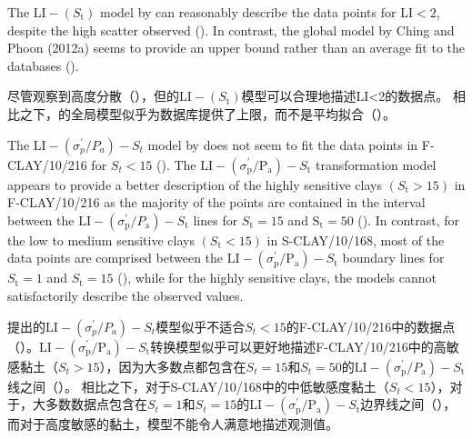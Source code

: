 \begin{ParaColumn}
    \switchcolumn*

    The $\mathrm{LI}-\left(S_{\mathrm{t}}\right)$ model by \citet{Bjerrum195449} can reasonably describe the data points for $\mathrm{LI}<2$, despite the high scatter observed (). In contrast, the global model by Ching and Phoon (2012a) seems to provide an upper bound rather than an average fit to the databases ().

    \switchcolumn

    尽管观察到高度分散（），但\citet{Bjerrum195449}的$\mathrm{LI}-\left(S_{\mathrm{t}}\right)$模型可以合理地描述LI<2的数据点。 相比之下，\citet{Ching2012522}的全局模型似乎为数据库提供了上限，而不是平均拟合（）。

    \switchcolumn*

    The $\mathrm{LI}-\left(\sigma_{p}^{\prime} / P_{a}\right)-S_{t}$ model by \citet{Ching2012522} does not seem to fit the data points in F-CLAY/10/216 for $S_t<15$ (). The $\mathrm{LI}-\left(\sigma_{\mathrm{p}}^{\prime} / \mathrm{P}_{\mathrm{a}}\right)-S_{\mathrm{t}}$ transformation model appears to provide a better description of the highly sensitive clays $\left(S_{\mathrm{t}}>15\right)$ in F-CLAY/10/216 as the majority of the points are contained in the interval between the $\mathrm{LI}-\left(\sigma_{\mathrm{p}}^{\prime} / P_{\mathrm{a}}\right)-S_{\mathrm{t}}$ lines for $S_{\mathrm{t}}=15$ and $\mathrm{S}_{\mathrm{t}}=50$ (). In contrast, for the low to medium sensitive clays $\left(S_{\mathrm{t}}<15\right)$ in S-CLAY/10/168, most of the data points are comprised between the $\mathrm{LI}-\left(\sigma_{\mathrm{p}}^{\prime} / \mathrm{P}_{\mathrm{a}}\right)-S_{\mathrm{t}}$ boundary lines for $S_{\mathrm{t}}=1$ and $S_{\mathrm{t}}=15$ (), while for the highly sensitive clays, the models cannot satisfactorily describe the observed values.

    \switchcolumn

    \citet{Ching2012522}提出的$\mathrm{LI}-\left(\sigma_{p}^{\prime} / P_{a}\right)-S_{t}$模型似乎不适合$S_t<15$的F-CLAY/10/216中的数据点（）。$\mathrm{LI}-\left(\sigma_{\mathrm{p}}^{\prime} / \mathrm{P}_{\mathrm{a}}\right)-S_{\mathrm{t}}$转换模型似乎可以更好地描述F-CLAY/10/216中的高敏感黏土（$S_t>15$），因为大多数点都包含在$S_t=15$和$S_t=50$的$\mathrm{LI}-\left(\sigma_{\mathrm{p}}^{\prime} / P_{\mathrm{a}}\right)-S_{\mathrm{t}}$线之间（）。 相比之下，对于S-CLAY/10/168中的中低敏感度黏土（$S_t<15$），对于，大多数数据点包含在$S_t=1$和$S_t=15$的$\mathrm{LI}-\left(\sigma_{\mathrm{p}}^{\prime} / \mathrm{P}_{\mathrm{a}}\right)-S_{\mathrm{t}}$边界线之间（），而对于高度敏感的黏土，模型不能令人满意地描述观测值。


\end{ParaColumn}
